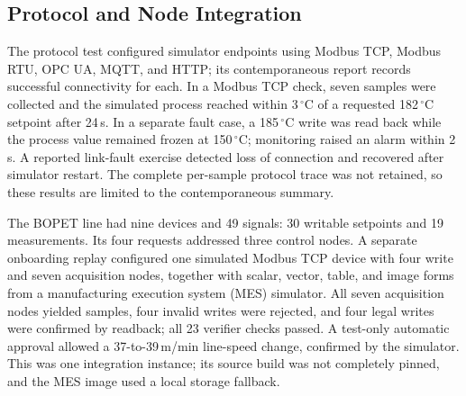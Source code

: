 \subsection{Protocol and Node Integration}
The protocol test configured simulator endpoints using Modbus TCP, Modbus RTU,
OPC UA, MQTT, and HTTP; its contemporaneous report records successful
connectivity for each. In a Modbus TCP check, seven samples were collected
and the simulated process reached within 3\,$^{\circ}$C of a requested
182\,$^{\circ}$C setpoint after 24\,s. In a separate fault case, a
185\,$^{\circ}$C write was read back while the process value remained frozen
at 150\,$^{\circ}$C; monitoring raised an alarm within 2\,s. A reported
link-fault exercise detected loss of connection and recovered after simulator
restart. The complete per-sample protocol trace was not retained, so these
results are limited to the contemporaneous summary.

The BOPET line had nine devices and 49 signals: 30 writable setpoints and 19
measurements. Its four requests addressed three control nodes. A separate
onboarding replay configured one simulated Modbus TCP device with four write
and seven acquisition nodes, together with scalar, vector, table, and image
forms from a manufacturing execution system (MES) simulator. All seven
acquisition nodes yielded samples, four invalid writes were rejected, and four
legal writes were confirmed by readback; all 23 verifier checks passed. A
test-only automatic approval allowed a 37-to-39\,m/min line-speed change,
confirmed by the simulator. This was one integration instance; its source
build was not completely pinned, and the MES image used a local storage
fallback.

